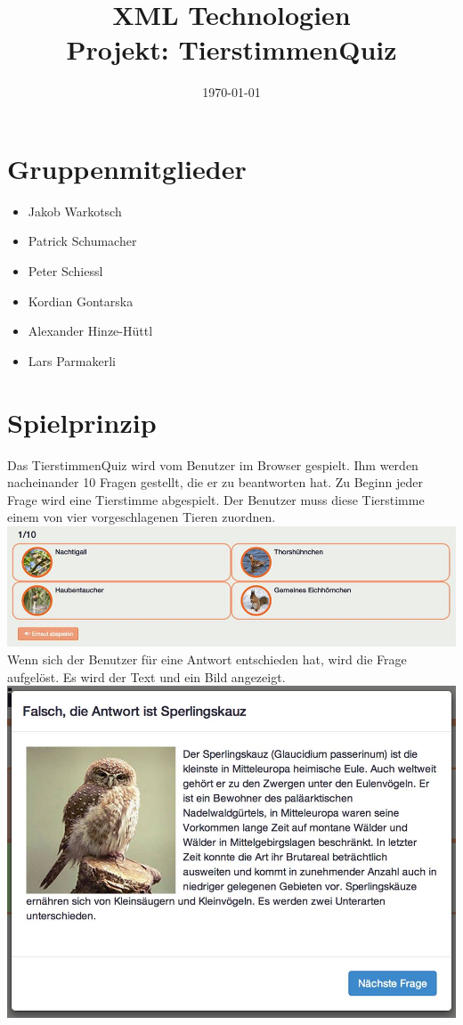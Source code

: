 \documentclass[a4paper,10pt]{article}
\title{\textbf{XML Technologien\\ Projekt: TierstimmenQuiz}}
\date{\today}
\begin{document}
\maketitle
\section{Gruppenmitglieder}
    \begin{itemize}
        \item Jakob Warkotsch
        \item Patrick Schumacher
        \item Peter Schiessl
        \item Kordian Gontarska
        \item Alexander Hinze-Hüttl
        \item Lars Parmakerli
    \end{itemize}

\section{Spielprinzip}
    Das TierstimmenQuiz wird vom Benutzer im Browser gespielt.
    Ihm werden nacheinander 10 Fragen gestellt, die er zu beantworten hat.
    Zu Beginn jeder Frage wird eine Tierstimme abgespielt. Der Benutzer muss 
    diese Tierstimme einem von vier vorgeschlagenen Tieren zuordnen.\\
    \includegraphics[scale=0.5]{p1}
    Wenn sich der Benutzer für eine Antwort entschieden hat, wird die Frage aufgelöst.
    Es wird der Text und ein Bild angezeigt.\\
    \includegraphics[scale=0.3]{p2}
\end{document}
